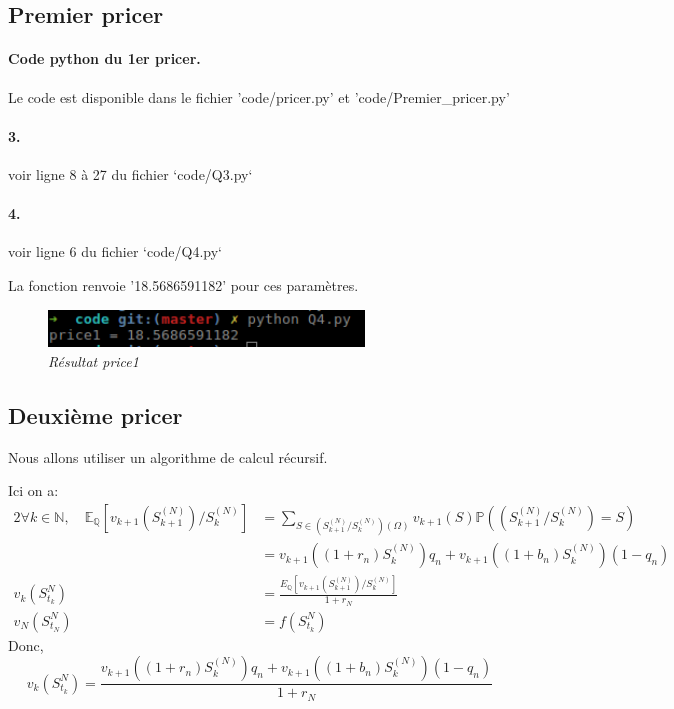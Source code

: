 \documentclass[10pt]{article}
\begin{document}
  \newpage
  \subsection{Premier pricer}
  \paragraph{Code python du 1er pricer.} Le code est disponible dans le fichier 'code/pricer.py' et 'code/Premier\_pricer.py'
  
  \paragraph{3.} voir ligne 8 à 27 du fichier `code/Q3.py`
  
  \paragraph{4.} voir ligne 6 du fichier `code/Q4.py`
  
  La fonction renvoie '18.5686591182' pour ces paramètres.

  \begin{figure}[H]
    \begin{center}
      \includegraphics[height=1cm,keepaspectratio]{./images/q4.png}
    \end{center}
    \caption{\textit{Résultat price1}}
    \label{q4}
  \end{figure}
  
  
  \subsection{Deuxième pricer}    
  Nous allons utiliser un algorithme de calcul récursif. 
  
  Ici on a:
  \begin{alignat*}{2}
    \forall k \in \mathbb{N}, \quad \mathbb{E}_{\mathbb{Q}}[v_{k+1}(S^{(N)}_{k + 1}) \slash S^{(N)}_k] 	&= \sum_{S \in(S^{(N)}_{k + 1} \slash S^{(N)}_k)(\Omega)} v_{k+1}(S) \mathbb{P}((S^{(N)}_{k + 1} \slash S^{(N)}_{k}) = S)\\
													& = \boxed{v_{k+1}((1 + r_n)S^{(N)}_{k})q_n + v_{k+1}((1 + b_n)S^{(N)}_{k})(1 - q_n)} \\
    v_k(S_{t_k}^{N}) \quad \quad \quad \quad \quad \quad &= \frac{{E}_{\mathbb{Q}}[v_{k+1}(S^{(N)}_{k + 1}) \slash S^{(N)}_k]}{1+r_N} \\
    v_N(S_{t_N}^{N}) \quad \quad \quad \quad \quad \quad &= f(S_{t_k}^{N})
  \end{alignat*}
  Donc, $$\boxed{v_k(S_{t_k}^{N})=\frac{{v_{k+1}((1 + r_n)S^{(N)}_{k})q_n + v_{k+1}((1 + b_n)S^{(N)}_{k})(1 - q_n)} }{1+r_N}}$$
\end{document}
